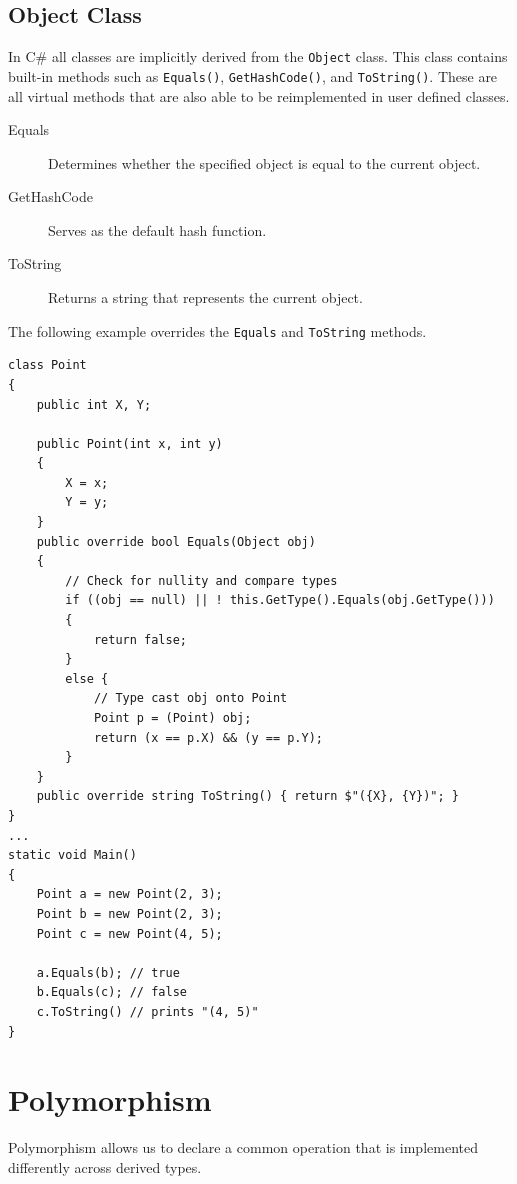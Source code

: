 \documentclass{article}
\begin{document}
\subsection{Object Class}
In C\# all classes are implicitly derived from the
\texttt{Object} class. This class contains built-in methods
such as \texttt{Equals()},
\texttt{GetHashCode()}, and
\texttt{ToString()}. These are all virtual methods that are
also able to be reimplemented in user defined classes.
\begin{description}
    \item[Equals] Determines whether the specified object is equal to
          the current object.
    \item[GetHashCode] Serves as the default hash function.
    \item[ToString] Returns a string that represents the current
          object.
\end{description}
The following example overrides the \texttt{Equals} and \texttt{ToString} methods.
\begin{verbatim}
class Point
{
    public int X, Y;

    public Point(int x, int y)
    {
        X = x;
        Y = y;
    }
    public override bool Equals(Object obj)
    {
        // Check for nullity and compare types
        if ((obj == null) || ! this.GetType().Equals(obj.GetType()))
        {
            return false;
        }
        else {
            // Type cast obj onto Point
            Point p = (Point) obj;
            return (x == p.X) && (y == p.Y);
        }
    }
    public override string ToString() { return $"({X}, {Y})"; }
}
...
static void Main()
{
    Point a = new Point(2, 3);
    Point b = new Point(2, 3);
    Point c = new Point(4, 5);

    a.Equals(b); // true
    b.Equals(c); // false
    c.ToString() // prints "(4, 5)"
}
\end{verbatim}
\section{Polymorphism}
Polymorphism allows us to declare a common operation that is
implemented differently across derived types.
\end{document}
